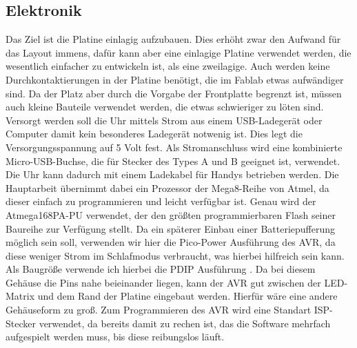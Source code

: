 \documentclass[12pt,journal,compsoc]{IEEEtran}
\begin{document}
\subsection{Elektronik}
Das Ziel ist die Platine einlagig aufzubauen. Dies erhöht zwar den Aufwand für das Layout immens, dafür kann aber eine einlagige Platine verwendet werden, die wesentlich einfacher zu entwickeln ist, als eine zweilagige. Auch werden keine Durchkontaktierungen in der Platine benötigt, die im Fablab etwas aufwändiger sind. Da der Platz aber durch die Vorgabe der Frontplatte begrenzt ist, müssen auch kleine Bauteile verwendet werden, die etwas schwieriger zu löten sind.
Versorgt werden soll die Uhr mittels Strom aus einem USB-Ladegerät oder Computer damit kein besonderes Ladegerät notwenig ist. Dies legt die Versorgungsspannung auf 5 Volt fest. Als Stromanschluss wird eine kombinierte Micro-USB-Buchse, die für Stecker des Types A und B geeignet ist, verwendet. Die Uhr kann dadurch mit einem Ladekabel für Handys betrieben werden.
Die Hauptarbeit übernimmt dabei ein Prozessor der  Mega8-Reihe von Atmel, da dieser einfach zu programmieren und leicht verfügbar ist. Genau wird der Atmega168PA-PU verwendet, der den größten programmierbaren Flash seiner Baureihe zur Verfügung stellt. Da ein späterer Einbau einer Batteriepufferung möglich sein soll, verwenden wir hier die Pico-Power Ausführung des AVR, da diese weniger Strom im Schlafmodus verbraucht, was hierbei hilfreich sein kann. Als Baugröße verwende ich hierbei die PDIP  Ausführung . Da bei diesem Gehäuse die Pins nahe beieinander liegen, kann der AVR gut zwischen der LED-Matrix und dem Rand der Platine eingebaut werden. Hierfür wäre eine andere Gehäuseform zu groß. Zum Programmieren des AVR wird eine Standart ISP-Stecker verwendet, da bereits damit zu rechen ist, das die Software mehrfach aufgespielt werden muss, bis diese reibungslos läuft. 
\end{document}
